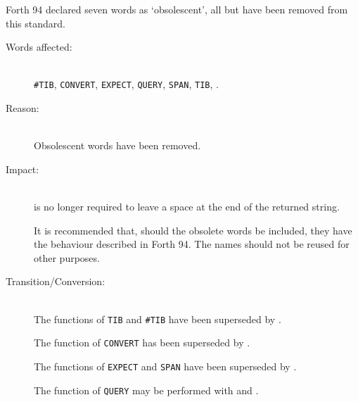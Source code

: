 Forth 94 declared seven words as `obsolescent', all but
 have been removed from this standard.

\begin{description}
\item[Words affected:] ~\\
	\texttt{\#TIB},
  	\texttt{CONVERT},
  	\texttt{EXPECT},
  	\texttt{QUERY},
  	\texttt{SPAN},
  	\texttt{TIB},
  	.
  
\item[Reason:] ~\\
	Obsolescent words have been removed.
  
\item[Impact:] ~\\
	 is no longer required to leave a space at the end of
	the returned string.

	It is recommended that, should the obsolete words be included,
	they have the behaviour described in Forth 94.  The names should
	not be reused for other purposes.

\item[Transition/Conversion:] ~\\
	The functions of \texttt{TIB} and \texttt{\#TIB} have been
	superseded by .
 
	The function of \texttt{CONVERT} has been superseded by
	.

	The functions of \texttt{EXPECT} and \texttt{SPAN} have been
	superseded by .

	The function of \texttt{QUERY} may be performed with 
	and .
\end{description}


\subsection[Separate Floating-point Stack is now Standard]{%
} %
\label{diff:fpstack}



